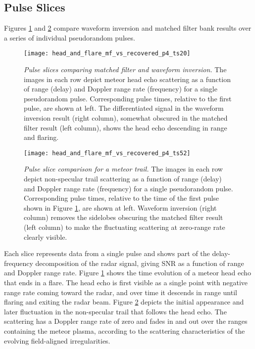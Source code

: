 \subsection{Pulse Slices}
Figures \ref{fig:head_timeslice} and \ref{fig:trail_timeslice} compare waveform inversion and matched filter bank results over a series of individual pseudorandom pulses.
\begin{figure}[tpb]
 \centering
 \texttt{[image: head\_and\_flare\_mf\_vs\_recovered\_p4\_ts20]}
 \caption[Pulse slices comparing matched filter and waveform inversion]{\emph{Pulse slices comparing matched filter and waveform inversion.} The images in each row depict meteor head echo scattering as a function of range (delay) and Doppler range rate (frequency) for a single pseudorandom pulse. Corresponding pulse times, relative to the first pulse, are shown at left. The differentiated signal in the waveform inversion result (right column), somewhat obscured in the matched filter result (left column), shows the head echo descending in range and flaring.}
 \label{fig:head_timeslice}
\end{figure}%
\begin{figure}[tpb]
 \centering
 \texttt{[image: head\_and\_flare\_mf\_vs\_recovered\_p4\_ts52]}
 \caption[Pulse slice comparison for a meteor trail]{\emph{Pulse slice comparison for a meteor trail.} The images in each row depict non-specular trail scattering as a function of range (delay) and Doppler range rate (frequency) for a single pseudorandom pulse. Corresponding pulse times, relative to the time of the first pulse shown in Figure \ref{fig:head_timeslice}, are shown at left. Waveform inversion (right column) removes the sidelobes obscuring the matched filter result (left column) to make the fluctuating scattering at zero-range rate clearly visible.}
 \label{fig:trail_timeslice}
\end{figure}%
Each slice represents data from a single pulse and shows part of the delay-frequency decomposition of the radar signal, giving SNR as a function of range and Doppler range rate. Figure \ref{fig:head_timeslice} shows the time evolution of a meteor head echo that ends in a flare. The head echo is first visible as a single point with negative range rate coming toward the radar, and over time it descends in range until flaring and exiting the radar beam. Figure \ref{fig:trail_timeslice} depicts the initial appearance and later fluctuation in the non-specular trail that follows the head echo. The scattering has a Doppler range rate of zero and fades in and out over the ranges containing the meteor plasma, according to the scattering characteristics of the evolving field-aligned irregularities.

